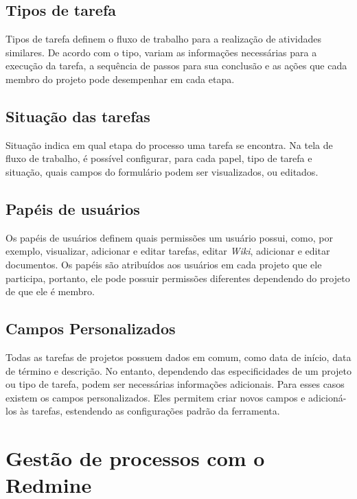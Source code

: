\subsection{Tipos de tarefa}\label{subsection:redmine-estrutura_basica-tracker}

Tipos de tarefa definem o fluxo de trabalho para a realização de atividades similares. De acordo com o tipo, variam as informações necessárias para a execução da tarefa, a sequência de passos para sua conclusão e as ações que cada membro do projeto pode desempenhar em cada etapa.

\subsection{Situação das tarefas}\label{subsection:redmine-estrutura_basica-status}

Situação indica em qual etapa do processo uma tarefa se encontra. Na tela de fluxo de trabalho, é possível configurar, para cada papel, tipo de tarefa e situação, quais campos do formulário podem ser visualizados, ou editados.

\subsection{Papéis de usuários}\label{subsection:redmine-estrutura_basica-role}

Os papéis de usuários definem quais permissões um usuário possui, como, por exemplo, visualizar, adicionar e editar tarefas, editar \textit{Wiki}, adicionar e editar documentos. Os papéis são atribuídos aos usuários em cada projeto que ele participa, portanto, ele pode possuir permissões diferentes dependendo do projeto de que ele é membro.

\subsection{Campos Personalizados}\label{subsection:redmine-estrutura_basica-custom_fields}

Todas as tarefas de projetos possuem dados em comum, como data de início, data de término e descrição. No entanto, dependendo das especificidades de um projeto ou tipo de tarefa, podem ser necessárias informações adicionais. Para esses casos existem os campos personalizados. Eles permitem criar novos campos e adicioná-los às tarefas, estendendo as configurações padrão da ferramenta.

\section{Gestão de processos com o Redmine}\label{sec:redmine-gestao_processos}

